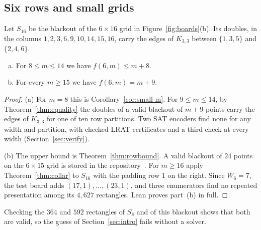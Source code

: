 \subsection{Six rows and small grids}

Let $S_{16}$ be the blackout of the $6\times16$ grid in Figure~\ref{fig:boards}(b). Its doubles, in the columns $1,2,3,6,9,10,14,15,16$, carry the edges of $K_{3,3}$ between $\{1,3,5\}$ and $\{2,4,6\}$.

\begin{theorem}\label{thm:sixrow}
\begin{enumerate}[(a)]
\item For $8\le m\le14$ we have $f(6,m)\le m+8$.
\item For every $m\ge15$ we have $f(6,m)=m+9$.
\end{enumerate}
\end{theorem}

\begin{proof}
(a) For $m=8$ this is Corollary~\ref{cor:small-m}. For $9\le m\le14$, by
Theorem~\ref{thm:equality} the doubles of a valid blackout of $m+9$ points carry the edges of
$K_{3,3}$ for one of ten row partitions. Two SAT encoders find none for any width and
partition, with checked LRAT certificates and a third check at every width
(Section~\ref{sec:verify}).

(b) The upper bound is Theorem~\ref{thm:rowbound}. A valid blackout of $24$ points on the
$6\times15$ grid is stored in the repository~\cite{repo}. For $m\ge16$ apply
Theorem~\ref{thm:collar} to $S_{16}$ with the padding row $1$ on the right. Since $W_6=7$,
the test board adds $(17,1),\dots,(23,1)$, and three enumerators find no repeated
presentation among its $4{,}627$ rectangles. Lean proves part~(b) in full.
\end{proof}

Checking the $364$ and $592$ rectangles of $S_8$ and of this blackout shows that both are
valid, so the guess of Section~\ref{sec:intro} fails without a solver.

